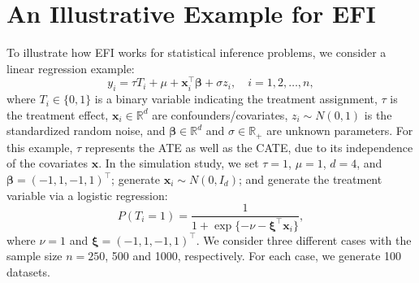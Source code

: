 \documentclass[11pt]{article}
\newcommand{\bx}{{\boldsymbol x}}
\newcommand{\bxi}{{\boldsymbol \xi}}
\newcommand{\bbeta}{{\boldsymbol \beta}}
\newcommand{\btheta}{{\boldsymbol \theta}}
\begin{document}








\section{An Illustrative Example for EFI} \label{illusexample}

To illustrate how EFI works for statistical inference problems, we consider 
a  linear regression example: 
\begin{equation} \label{causalmodel1}
y_i=\tau T_i +\mu+\bx_i^{\top} \bbeta+\sigma z_i, \quad i=1,2,\ldots,n,
\end{equation}
where $T_i \in \{0,1\}$ is a binary variable indicating the treatment assignment,  
$\tau$ is the treatment effect, $\bx_i \in \mathbb{R}^d$ are confounders/covariates, $z_i\sim N(0,1)$ is the standardized random noise, and $\bbeta \in \mathbb{R}^d$ and $\sigma\in \mathbb{R}_+$ are unknown parameters. 
For this example, $\tau$ represents the ATE as well as the CATE, 
due to its independence of the covariates $\bx$. 
In the simulation study, we set $\tau=1$, $\mu=1$, $d=4$, and $\bbeta=(-1,1,-1,1)^{\top}$; 
 generate $\bx_i \sim N(0,I_d)$; and   
 generate the treatment variable via a logistic regression:
\begin{equation} \label{treatmodel1}
P(T_i=1)=\frac{1}{1+\exp\{-\nu-\bxi^{\top} \bx_i \}},
\end{equation}
where $\nu=1$ and $\bxi=(-1,1,-1,1)^{\top}$.  
We consider three different cases with the sample size 
$n=250$, 500 and 1000, respectively. For each case, we  generate 100 datasets. 
\end{document}
